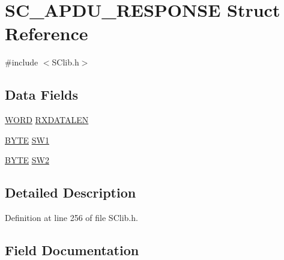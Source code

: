\hypertarget{struct_s_c___a_p_d_u___r_e_s_p_o_n_s_e}{}\section{S\+C\+\_\+\+A\+P\+D\+U\+\_\+\+R\+E\+S\+P\+O\+N\+S\+E Struct Reference}
\label{struct_s_c___a_p_d_u___r_e_s_p_o_n_s_e}


{\ttfamily \#include $<$S\+Clib.\+h$>$}

\subsection*{Data Fields}
\begin{DoxyCompactItemize}
\item 
\hyperlink{_generic_type_defs_8h_a2b0e863dadf920709ec53d9088ee7c91}{W\+O\+R\+D} \hyperlink{struct_s_c___a_p_d_u___r_e_s_p_o_n_s_e_a7c4127a3f3a1615439989b13ede2154d}{R\+X\+D\+A\+T\+A\+L\+E\+N}
\item 
\hyperlink{_generic_type_defs_8h_a4ae1dab0fb4b072a66584546209e7d58}{B\+Y\+T\+E} \hyperlink{struct_s_c___a_p_d_u___r_e_s_p_o_n_s_e_a6b2c092c7ea52ca22026a017458cdbf8}{S\+W1}
\item 
\hyperlink{_generic_type_defs_8h_a4ae1dab0fb4b072a66584546209e7d58}{B\+Y\+T\+E} \hyperlink{struct_s_c___a_p_d_u___r_e_s_p_o_n_s_e_a49b232748a8c085d7940e953c32f4f8c}{S\+W2}
\end{DoxyCompactItemize}


\subsection{Detailed Description}


Definition at line 256 of file S\+Clib.\+h.



\subsection{Field Documentation}
\hypertarget{struct_s_c___a_p_d_u___r_e_s_p_o_n_s_e_a7c4127a3f3a1615439989b13ede2154d}{}
